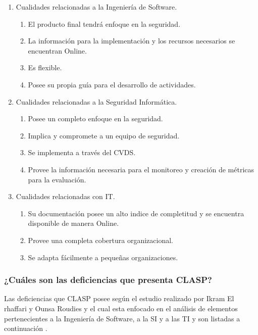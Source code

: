 \documentclass[runningheads,a4paper]{llncs}
\begin{document}
\begin{enumerate}
	\item Cualidades relacionadas a la Ingeniería de \gls{Software}.
		\begin{enumerate}
			\item El producto final tendrá enfoque en la seguridad.
			\item La información para la implementación y los recursos necesarios se encuentran \gls{Online}.
			\item Es flexible.
			\item Posee su propia guía para el desarrollo de actividades.\\
			
		\end{enumerate}
	\item Cualidades relacionadas a la Seguridad Informática.
		\begin{enumerate}
			\item Posee un completo enfoque en la seguridad.
			\item Implica y compromete a un equipo de seguridad.
			\item Se implementa a través del \gls{CVDS}.
			\item Provee la información necesaria para el monitoreo y creación de métricas para la evaluación.\\
		\end{enumerate}
	\item Cualidades relacionadas con \gls{IT}.
		\begin{enumerate}
			\item Su documentación posee un alto indice de completitud y se encuentra disponible de manera \gls{Online}.
			\item Provee una completa cobertura organizacional.
			\item Se adapta fácilmente a pequeñas organizaciones.
		\end{enumerate}
\end{enumerate}

\subsubsection{¿Cuáles son las deficiencias que presenta \gls{CLASP}?}
Las deficiencias que \gls{CLASP} posee según el estudio realizado por Ikram El rhaffari y Ounsa Roudies y el cual esta enfocado en el análisis de elementos pertenecientes a la Ingeniería de \gls{Software}, a la \gls{SI} y a las \gls{TI} y son listadas a continuación \cite{BenchmarkingSDLCLAPS}. 
\end{document}
